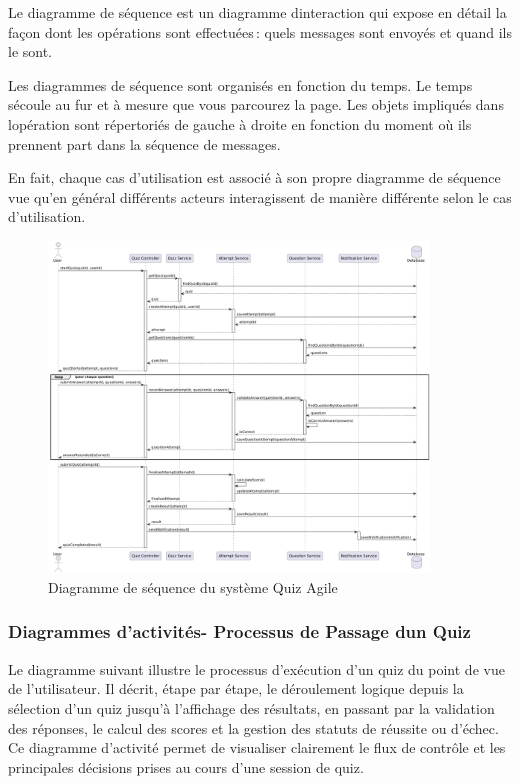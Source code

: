 \documentclass[12pt,a4paper,twoside,openright]{report}
\begin{document}
Le diagramme de séquence est un diagramme d\textquotesingle interaction
qui expose en détail la façon dont les opérations sont effectuées\,:
quels messages sont envoyés et quand ils le sont.~~

Les diagrammes de séquence sont organisés en fonction du temps. Le temps
s\textquotesingle écoule au fur et à mesure que vous parcourez la page.
Les objets impliqués dans l\textquotesingle opération sont répertoriés
de gauche à droite en fonction du moment où ils prennent part dans la
séquence de messages.~

En fait, chaque cas d'utilisation est associé à son propre diagramme de
séquence vue qu'en général différents acteurs interagissent de manière
différente selon le cas d'utilisation.

\begin{figure}[H]
\centering
\includegraphics[width=0.9\textwidth]{latex_media/media/image19.png}
\caption{Diagramme de séquence du système Quiz Agile}
\label{fig:diagramme-sequence}
\end{figure}

\hypertarget{diagrammes-dactivituxe9s--processus-de-passage-dun-quiz}{%
\subsubsection{Diagrammes d'activités- Processus de Passage
d\textquotesingle un
Quiz}\label{diagrammes-dactivituxe9s--processus-de-passage-dun-quiz}}

Le diagramme suivant illustre le processus d'exécution d'un quiz du
point de vue de l'utilisateur. Il décrit, étape par étape, le
déroulement logique depuis la sélection d'un quiz jusqu'à l'affichage
des résultats, en passant par la validation des réponses, le calcul des
scores et la gestion des statuts de réussite ou d'échec. Ce diagramme
d'activité permet de visualiser clairement le flux de contrôle et les
principales décisions prises au cours d'une session de quiz.
\end{document}
